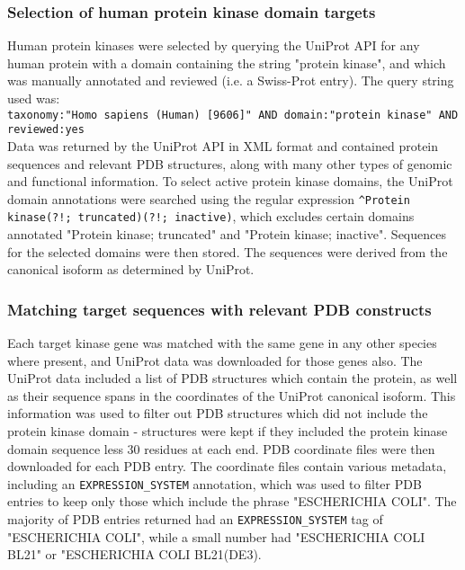 \documentclass[aps,pre,twocolumn,nofootinbib,superscriptaddress,linenumbers]{revtex4-1}
\begin{document}
\subsubsection{Selection of human protein kinase domain targets}

Human protein kinases were selected by querying the UniProt API for any human protein with a domain containing the string "protein kinase", and which was manually annotated and reviewed (i.e. a Swiss-Prot entry).
The query string used was:\\
{\tt taxonomy:"Homo sapiens (Human) [9606]" AND domain:"protein kinase" AND reviewed:yes}\\
Data was returned by the UniProt API in XML format and contained protein sequences and relevant PDB structures, along with many other types of genomic and functional information.
To select active protein kinase domains, the UniProt domain annotations were searched using the regular expression {\tt \^{}Protein kinase(?!; truncated)(?!; inactive)}, which excludes certain domains annotated "Protein kinase; truncated" and "Protein kinase; inactive".
Sequences for the selected domains were then stored.
The sequences were derived from the canonical isoform as determined by UniProt.

\subsubsection{Matching target sequences with relevant PDB constructs}

Each target kinase gene was matched with the same gene in any other species where present, and UniProt data was downloaded for those genes also.
The UniProt data included a list of PDB structures which contain the protein, as well as their sequence spans in the coordinates of the UniProt canonical isoform.
This information was used to filter out PDB structures which did not include the protein kinase domain - structures were kept if they included the protein kinase domain sequence less 30 residues at each end.
PDB coordinate files were then downloaded for each PDB entry.
The coordinate files contain various metadata, including an {\tt EXPRESSION\_SYSTEM} annotation, which was used to filter PDB entries to keep only those which include the phrase "ESCHERICHIA COLI".
The majority of PDB entries returned had an {\tt EXPRESSION\_SYSTEM} tag of "ESCHERICHIA COLI", while a small number had "ESCHERICHIA COLI BL21" or "ESCHERICHIA COLI BL21(DE3).
\end{document}
